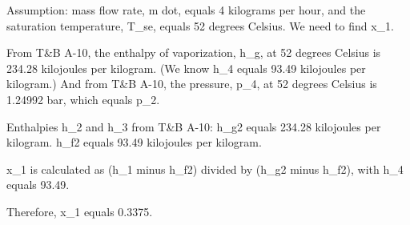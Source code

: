 Assumption: mass flow rate, m dot, equals 4 kilograms per hour, and the saturation temperature, T_se, equals 52 degrees Celsius.
We need to find x_1.

From T&B A-10, the enthalpy of vaporization, h_g, at 52 degrees Celsius is 234.28 kilojoules per kilogram.
(We know h_4 equals 93.49 kilojoules per kilogram.)
And from T&B A-10, the pressure, p_4, at 52 degrees Celsius is 1.24992 bar, which equals p_2.

Enthalpies h_2 and h_3 from T&B A-10:
h_g2 equals 234.28 kilojoules per kilogram.
h_f2 equals 93.49 kilojoules per kilogram.

x_1 is calculated as (h_1 minus h_f2) divided by (h_g2 minus h_f2), with h_4 equals 93.49.

Therefore, x_1 equals 0.3375.